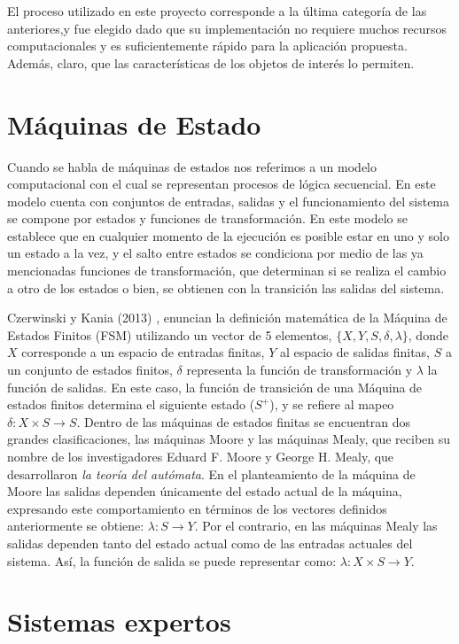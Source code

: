 El proceso utilizado en este proyecto corresponde a la última categoría de las anteriores,y fue elegido dado que su implementación no requiere muchos recursos computacionales y es suficientemente rápido para la aplicación propuesta. Además, claro, que las características de los objetos de interés lo permiten.


\section{Máquinas de Estado}

Cuando se habla de máquinas de estados nos referimos a un modelo computacional con el cual se representan procesos de lógica secuencial. En este modelo cuenta con conjuntos de entradas, salidas y el funcionamiento del sistema se compone por estados y funciones de transformación. En este modelo se establece que en cualquier momento de la ejecución es posible estar en uno y solo un estado a la vez, y el salto entre estados se condiciona por medio de las ya mencionadas funciones de transformación, que determinan si se realiza el cambio a otro de los estados o bien, se obtienen con la transición las salidas del sistema.

Czerwinski y Kania (2013) \cite{czerwinski_definitions_2013}, enuncian la definición matemática de la Máquina de Estados Finitos (FSM) utilizando un vector de 5 elementos, $ \{X,Y,S,\delta,\lambda\}$, donde $X$ corresponde a un espacio de entradas finitas, $Y$ al espacio de salidas finitas, $S$ a un conjunto de estados finitos, $\delta$ representa la función de transformación y $\lambda$ la función de salidas. En este caso, la función de transición de una Máquina de estados finitos determina el siguiente estado ($S^+$), y se refiere al mapeo $\delta: X \times S \to S $. 
Dentro de las máquinas de estados finitas se encuentran dos grandes clasificaciones, las máquinas Moore y las máquinas Mealy, que reciben su nombre de los investigadores Eduard F. Moore y George H. Mealy, que desarrollaron \textit{la teoría del autómata}. En el planteamiento de la máquina de Moore las salidas dependen únicamente del estado actual de la máquina, expresando este comportamiento en términos de los vectores definidos anteriormente se obtiene: $\lambda: S \to Y$. Por el contrario, en las máquinas Mealy las salidas dependen tanto del estado actual como de las entradas actuales del sistema. Así, la función de salida se puede representar como: $\lambda: X \times S \to Y$.


\section{Sistemas expertos}
 
